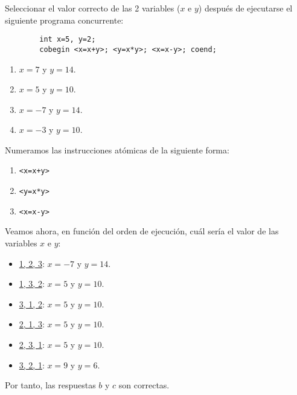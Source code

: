 \begin{ejercicio}
    Seleccionar el valor correcto de las 2 variables ($x$ e $y$) después de ejecutarse el siguiente programa concurrente:
    \begin{verbatim}
        int x=5, y=2;
        cobegin <x=x+y>; <y=x*y>; <x=x-y>; coend;
    \end{verbatim}
    \begin{enumerate}[label=(\alph*)]
        \item $x=7$ y $y=14$.
        \item $x=5$ y $y=10$.
        \item $x=-7$ y $y=14$.
        \item $x=-3$ y $y=10$.
    \end{enumerate}

    Numeramos las instrucciones atómicas de la siguiente forma:
    \begin{enumerate}
        \item \verb|<x=x+y>|
        \item \verb|<y=x*y>|
        \item \verb|<x=x-y>|
    \end{enumerate}

    Veamos ahora, en función del orden de ejecución, cuál sería el valor de las variables $x$ e $y$:
    \begin{itemize}
        \item \ul{1, 2, 3}: $x=-7$ y $y=14$.
        \item \ul{1, 3, 2}: $x=5$ y $y=10$.
        \item \ul{3, 1, 2}: $x=5$ y $y=10$.
        \item \ul{2, 1, 3}: $x=5$ y $y=10$.
        \item \ul{2, 3, 1}: $x=5$ y $y=10$.
        \item \ul{3, 2, 1}: $x=9$ y $y=6$.
    \end{itemize}

    Por tanto, las respuestas $b$ y $c$ son correctas.
\end{ejercicio}

